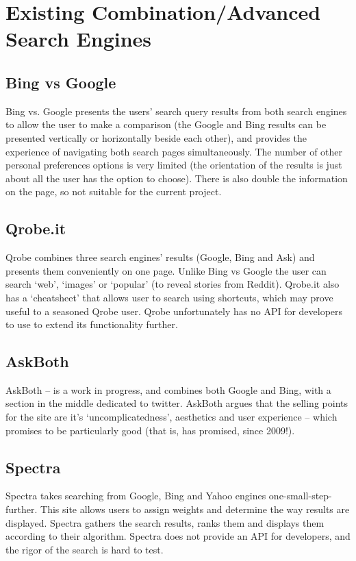 \documentclass[10pt]{article}
\begin{document}
\section{Existing Combination/Advanced Search Engines}\label{Existing Combination/Advanced Search Engines}
\subsection{Bing vs Google}
Bing vs. Google presents the users’ search query results from both search engines to allow the user to make a comparison (the Google and Bing results can be presented vertically or horizontally beside each other), and provides the experience of navigating both search pages simultaneously.  
The number of other personal preferences options is very limited (the orientation of the results is just about all the user has the option to choose). There is also double the information on the page, so not suitable for the current project.

\subsection{Qrobe.it}
Qrobe combines three search engines’ results (Google, Bing and Ask) and presents them conveniently on one page. Unlike Bing vs Google the user can search ‘web’, ‘images’ or ‘popular’ (to reveal stories from Reddit). Qrobe.it also has a ‘cheatsheet’ that allows user to search using shortcuts, which may prove useful to a seasoned Qrobe user. Qrobe unfortunately has no API for developers to use to extend its functionality further.

\subsection{AskBoth}
AskBoth – is a work in progress, and combines both Google and Bing, with a section in the middle dedicated to twitter. AskBoth argues that the selling points for the site are it’s ‘uncomplicatedness’, aesthetics and user experience – which promises to be particularly good (that is, has promised, since 2009!).

\subsection{Spectra}
Spectra takes searching from Google, Bing and Yahoo engines one-small-step-further. This site allows users to assign weights and determine the way results are displayed. Spectra gathers the search results, ranks them and displays them according to their algorithm. Spectra does not provide an API for developers, and the rigor of the search is hard to test.
\end{document}
